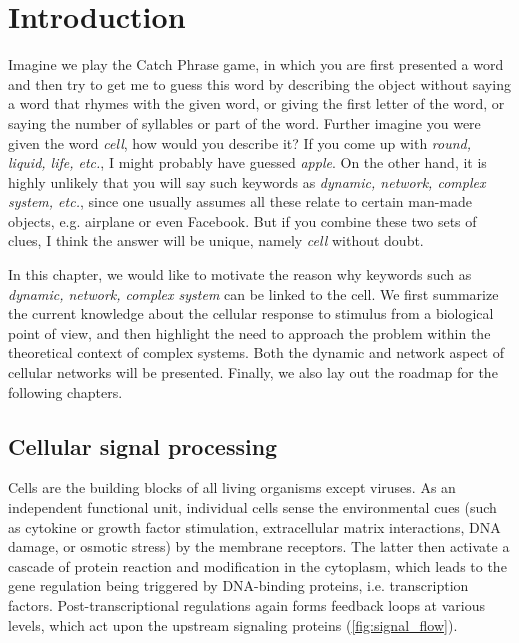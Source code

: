 \chapter{Introduction}
Imagine we play the Catch Phrase game, in which you are
first presented a word and then try to get me to guess this
word by describing the object without saying a word that rhymes with the given word, or giving the first letter of the word, or saying the number of syllables or part of the word.
Further imagine you were given the word \emph{cell}, how 
would you describe it? If you come up with \emph{round,
liquid, life, etc.}, I might probably have guessed 
\emph{apple}. On the other hand, it is highly unlikely that 
you will say such keywords as
\emph{dynamic, network, complex system, etc.}, since one 
usually assumes all these relate to certain man-made 
objects, e.g. airplane or even Facebook. 
But if you combine these two sets of clues, I think
the answer will be unique, namely \emph{cell} without doubt.

In this chapter, we would like to motivate the reason 
why keywords such
as \emph{dynamic, network, complex system} can be linked
to the cell.
We first summarize the current knowledge about
the cellular response to stimulus from a biological point of
view, and then highlight the need to approach the problem
within the theoretical context of complex systems. 
Both the dynamic and 
network aspect of cellular networks will be presented. 
Finally, we also lay out the roadmap for the following 
chapters.

\section{Cellular signal processing}
Cells are the building blocks of all living organisms except viruses. As an 
independent functional unit, individual cells sense the environmental cues 
(such as cytokine or growth factor stimulation, extracellular matrix interactions, DNA damage, or osmotic stress) by the membrane receptors. The latter
then activate a cascade of protein reaction and modification in the cytoplasm,
which leads to the gene regulation being triggered by 
DNA-binding proteins, i.e. transcription factors. Post-transcriptional
regulations again forms feedback loops at various levels, which act upon the
upstream signaling proteins (\ref{fig:signal_flow}).

